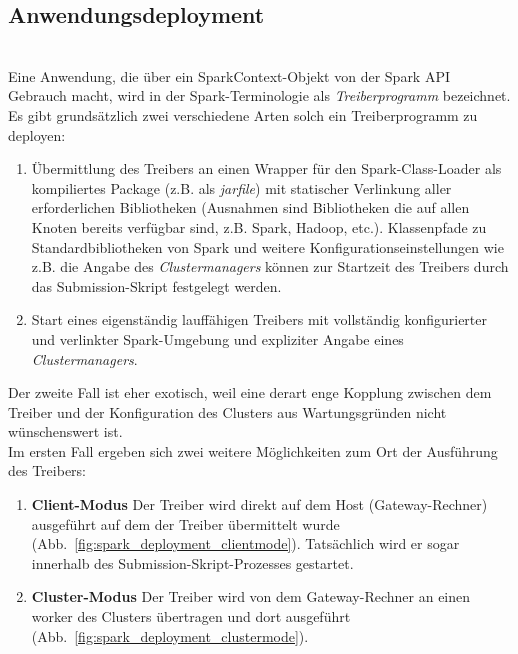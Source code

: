 \subsection{Anwendungsdeployment}\\

Eine Anwendung, die über ein SparkContext-Objekt von der Spark API Gebrauch macht, wird in der Spark-Terminologie als \textit{Treiberprogramm} bezeichnet. \\

Es gibt grundsätzlich zwei verschiedene Arten solch ein Treiberprogramm zu deployen:\\

\begin{enumerate}
	\item Übermittlung des Treibers an einen Wrapper für den Spark-Class-Loader als kompiliertes Package (z.B. als \textit{jarfile}) mit statischer Verlinkung aller erforderlichen Bibliotheken (Ausnahmen sind Bibliotheken die auf allen Knoten bereits verfügbar sind, z.B. Spark, Hadoop, etc.). Klassenpfade zu Standardbibliotheken von Spark und weitere Konfigurationseinstellungen wie z.B. die Angabe des \textit{Clustermanagers} können zur Startzeit des Treibers durch das Submission-Skript festgelegt werden.
	\item Start eines eigenständig lauffähigen Treibers mit vollständig konfigurierter und verlinkter Spark-Umgebung und expliziter Angabe eines \textit{Clustermanagers}.
\end{enumerate}

Der zweite Fall ist eher exotisch, weil eine derart enge Kopplung zwischen dem Treiber und der Konfiguration des Clusters aus Wartungsgründen nicht wünschenswert ist.\\

Im ersten Fall ergeben sich zwei weitere Möglichkeiten zum Ort der Ausführung des Treibers:\\

\begin{enumerate}
	\item \textbf{Client-Modus}
	Der Treiber wird direkt auf dem Host (Gateway-Rechner) ausgeführt auf dem der Treiber übermittelt wurde (Abb.~\ref{fig:spark_deployment_clientmode}). Tatsächlich wird er sogar innerhalb des Submission-Skript-Prozesses gestartet.
	\item \textbf{Cluster-Modus}
	Der Treiber wird von dem Gateway-Rechner an einen \gls{worker} des Clusters übertragen und dort ausgeführt (Abb.~\ref{fig:spark_deployment_clustermode}).
\end{enumerate}\\

